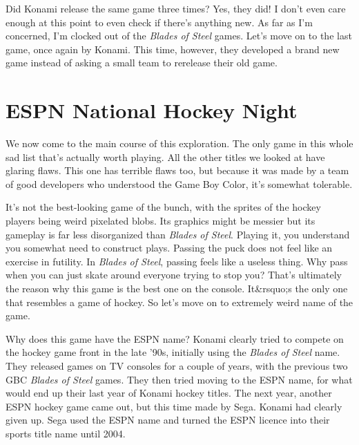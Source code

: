 \documentclass{book}
\let\oldcenter\center
\let\oldendcenter\endcenter
\renewenvironment{center}{\setlength\topsep{0pt}\oldcenter}{\oldendcenter}
\begin{document}
Did Konami release the same game three times? Yes, they did! I don’t even care enough at this point to even check if there’s anything new. As far as I’m concerned, I’m clocked out of the \emph{Blades of Steel} games. Let’s move on to the last game, once again by Konami. This time, however, they developed a brand new game instead of asking a small team to rerelease their old game.

\FloatBarrier\needspace{10mm}\section*{ESPN National Hockey Night}\nopagebreak[4]

\begin{center}
\quad\vspace{4pt}
\quad\vspace{4pt}
\quad\vspace{4pt}
\quad\vspace{4pt}
\end{center}

We now come to the main course of this exploration. The only game in this whole sad list that’s actually worth playing. All the other titles we looked at have glaring flaws. This one has terrible flaws too, but because it was made by a team of good developers who understood the Game Boy Color, it’s somewhat tolerable.

It’s not the best-looking game of the bunch, with the sprites of the hockey players being weird pixelated blobs. Its graphics might be messier but its gameplay is far less disorganized than \emph{Blades of Steel}. Playing it, you understand you somewhat need to construct plays. Passing the puck does not feel like an exercise in futility. In \emph{Blades of Steel}, passing feels like a useless thing. Why pass when you can just skate around everyone trying to stop you? That’s ultimately the reason why this game is the best one on the console. It&rsquo;s the only one that resembles a game of hockey. So let’s move on to extremely weird name of the game.

Why does this game have the ESPN name? Konami clearly tried to compete on the hockey game front in the late ’90s, initially using the \emph{Blades of Steel} name. They released games on TV consoles for a couple of years, with the previous two GBC \emph{Blades of Steel} games. They then tried moving to the ESPN name, for what would end up their last year of Konami hockey titles. The next year, another ESPN hockey game came out, but this time made by Sega. Konami had clearly given up. Sega used the ESPN name and turned the ESPN licence into their sports title name until 2004.
\end{document}
